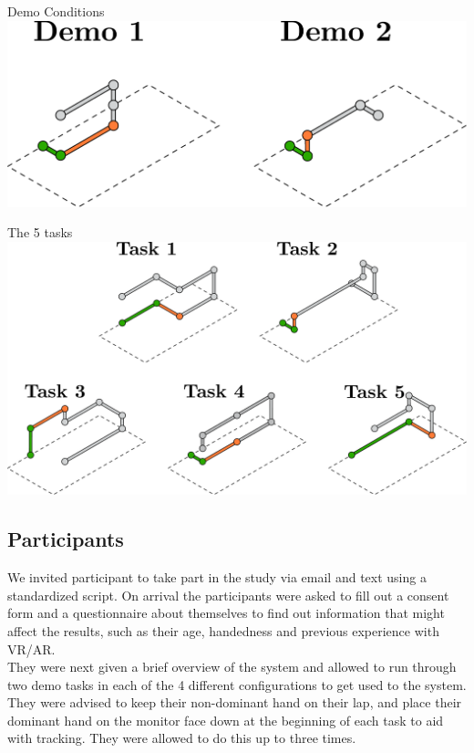 \begin{figureBox}[label={fig:demo-conditions}, width=0.8\linewidth]{Demo Conditions}
    \includegraphics[width = 0.65\linewidth]{./implementation/figures/demos.pdf}
\end{figureBox}


\begin{figureBox}[label={fig:tasks}, width=1.0\linewidth]{The 5 tasks}
    \includegraphics[width = 0.8\linewidth]{./implementation/figures/tasks.pdf}
\end{figureBox}

\subsection{Participants}
We invited participant to take part in the study via email and text using a standardized script. On arrival the participants were asked to fill out a consent form and a questionnaire about themselves to find out information that might affect the results, such as their age, handedness and previous experience with VR/AR. \\   

They were next given a brief overview of the system and allowed to run through two demo tasks in each of the 4 different configurations to get used to the system. They were advised to keep their non-dominant hand on their lap, and place their dominant hand on the monitor face down at the beginning of each task to aid with tracking. They were allowed to do this up to three times.\\

